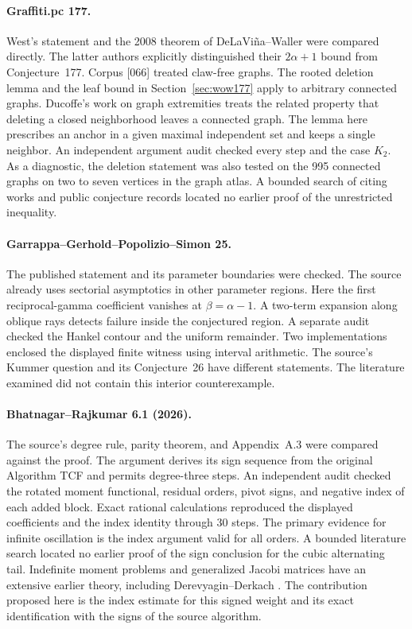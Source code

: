\documentclass[11pt,a4paper]{article}
\theoremstyle{definition}
\theoremstyle{remark}
\numberwithin{equation}{section}
\begin{document}
\paragraph{Graffiti.pc 177.}
West's statement and the 2008 theorem of DeLaVi\~na--Waller were
compared directly. The latter authors explicitly distinguished their
$2\alpha+1$ bound from Conjecture~177. Corpus [066] treated claw-free
graphs. The rooted deletion lemma and the leaf bound in
Section~\ref{sec:wow177} apply to arbitrary connected graphs.
Ducoffe's work on graph extremities \cite{Ducoffe2022} treats the
related property that deleting a closed neighborhood leaves a connected
graph. The lemma here prescribes an anchor in a given maximal independent
set and keeps a single neighbor. An independent argument audit checked
every step and the case $K_2$. As a diagnostic, the deletion statement
was also tested on the 995 connected graphs on two to seven vertices in
the graph atlas. A bounded search of citing works and public conjecture
records located no earlier proof of the unrestricted inequality.

\paragraph{Garrappa--Gerhold--Popolizio--Simon 25.}
The published statement and its parameter boundaries were checked.
The source already uses sectorial asymptotics in other parameter
regions. Here the first reciprocal-gamma coefficient vanishes at
$\beta=\alpha-1$. A two-term expansion along oblique rays detects
failure inside the conjectured region. A separate audit checked the
Hankel contour and the uniform remainder. Two implementations enclosed
the displayed finite witness using interval arithmetic. The source's
Kummer question and its Conjecture~26 have different statements.
The literature examined did not contain this interior counterexample.

\paragraph{Bhatnagar--Rajkumar 6.1 (2026).}
The source's degree rule, parity theorem, and Appendix~A.3 were compared
against the proof. The argument derives its sign sequence from the
original Algorithm TCF and permits degree-three steps. An independent
audit checked the rotated moment functional, residual orders, pivot signs,
and negative index of each added block. Exact rational calculations
reproduced the displayed coefficients and the index identity through
30 steps. The primary evidence for infinite oscillation is the index
argument valid for all orders. A bounded literature search located no
earlier proof of the sign conclusion for the cubic alternating tail.
Indefinite moment problems and generalized Jacobi matrices have an
extensive earlier theory, including Derevyagin--Derkach \cite{IndefJacobi}.
The contribution proposed here is the index estimate for this signed
weight and its exact identification with the signs of the source algorithm.
\end{document}
